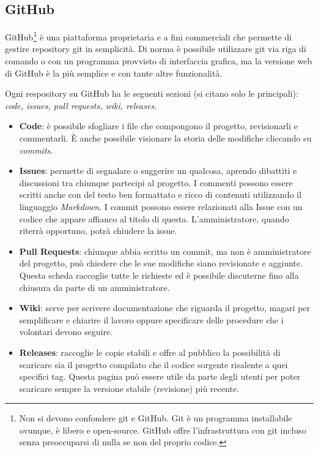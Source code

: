 \documentclass[a4paper,9pt]{extarticle}
\begin{document}
\begin{multicols*}{2}
\section{GitHub}

GitHub\footnote{Non si devono confondere git e GitHub. Git è un programma installabile ovunque, è libero e open-source. GitHub offre l'infrastruttura con git incluso senza preoccuparsi di nulla se non del proprio codice.} è una piattaforma proprietaria e a fini commerciali che permette di gestire repository git in semplicità. Di norma è possibile utilizzare git via riga di comando o con un programma provvisto di interfaccia grafica, ma la versione web di GitHub è la più semplice e con tante altre funzionalità.

Ogni respository su GitHub ha le seguenti sezioni (si citano solo le principali): \textit{code, issues, pull requests, wiki, releases}.
\begin{itemize}
    \item \textbf{Code}: è possibile sfogliare i file che compongono il progetto, revisionarli e commentarli. È anche possibile visionare la storia delle modifiche cliccando su \textit{commits}.
    \item \textbf{Issues}: permette di segnalare o suggerire un qualcosa, aprendo dibattiti e discussioni tra chiunque partecipi al progetto. I commenti possono essere scritti anche con del testo ben formattato e ricco di contenuti utilizzando il linguaggio \textit{Markdown}. I commit possono essere relazionati alla Issue con un codice che appare affianco al titolo di questa. L'amministratore, quando riterrà opportuno, potrà chiudere la issue.
    \item \textbf{Pull Requests}: chiunque abbia scritto un commit, ma non è amministratore del progetto, può chiedere che le sue modifiche siano revisionate e aggiunte. Questa scheda raccoglie tutte le richieste ed è possibile discuterne fino alla chiusura da parte di un amministratore.
    \item \textbf{Wiki}: serve per scrivere documentazione che riguarda il progetto, magari per semplificare e chiarire il lavoro oppure specificare delle procedure che i volontari devono seguire.
    \item \textbf{Releases}: raccoglie le copie stabili e offre al pubblico la possibilità di scaricare sia il progetto compilato che il codice sorgente risalente a quei specifici tag. Questa pagina può essere utile da parte degli utenti per poter scaricare sempre la versione stabile (revisione) più recente.
\end{itemize}


\end{multicols*}
\end{document}
